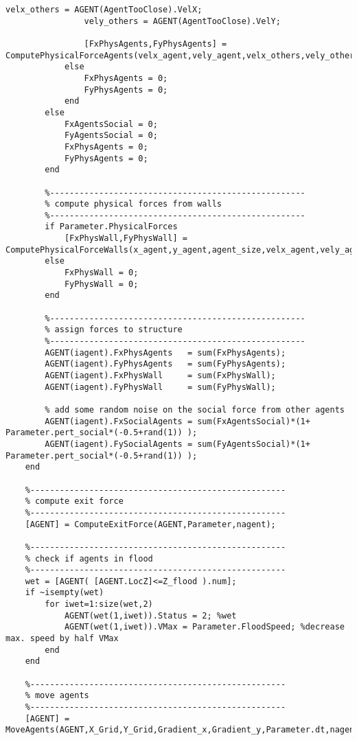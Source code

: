 \begin{lstlisting}[breaklines]
                velx_others = AGENT(AgentTooClose).VelX;
                vely_others = AGENT(AgentTooClose).VelY;

                [FxPhysAgents,FyPhysAgents] = ComputePhysicalForceAgents(velx_agent,vely_agent,velx_others,vely_others,Parameter,DistTooClose,Normal(indTooClose,:),Tangent(indTooClose,:));
            else
                FxPhysAgents = 0;
                FyPhysAgents = 0;
            end
        else
            FxAgentsSocial = 0;
            FyAgentsSocial = 0;
            FxPhysAgents = 0;
            FyPhysAgents = 0;
        end

        %----------------------------------------------------
        % compute physical forces from walls
        %----------------------------------------------------
        if Parameter.PhysicalForces
            [FxPhysWall,FyPhysWall] = ComputePhysicalForceWalls(x_agent,y_agent,agent_size,velx_agent,vely_agent,x_Buildings,y_Buildings,Parameter);
        else
            FxPhysWall = 0;
            FyPhysWall = 0;
        end

        %----------------------------------------------------
        % assign forces to structure
        %----------------------------------------------------
        AGENT(iagent).FxPhysAgents   = sum(FxPhysAgents);
        AGENT(iagent).FyPhysAgents   = sum(FyPhysAgents);
        AGENT(iagent).FxPhysWall     = sum(FxPhysWall);
        AGENT(iagent).FyPhysWall     = sum(FyPhysWall);

        % add some random noise on the social force from other agents
        AGENT(iagent).FxSocialAgents = sum(FxAgentsSocial)*(1+ Parameter.pert_social*(-0.5+rand(1)) );
        AGENT(iagent).FySocialAgents = sum(FyAgentsSocial)*(1+ Parameter.pert_social*(-0.5+rand(1)) );
    end

    %----------------------------------------------------
    % compute exit force
    %----------------------------------------------------
    [AGENT] = ComputeExitForce(AGENT,Parameter,nagent);

    %----------------------------------------------------
    % check if agents in flood
    %----------------------------------------------------
    wet = [AGENT( [AGENT.LocZ]<=Z_flood ).num];
    if ~isempty(wet)
        for iwet=1:size(wet,2)
            AGENT(wet(1,iwet)).Status = 2; %wet
            AGENT(wet(1,iwet)).VMax = Parameter.FloodSpeed; %decrease max. speed by half VMax
        end
    end

    %----------------------------------------------------
    % move agents
    %----------------------------------------------------
    [AGENT] = MoveAgents(AGENT,X_Grid,Y_Grid,Gradient_x,Gradient_y,Parameter.dt,nagent,Parameter);


\end{lstlisting}
